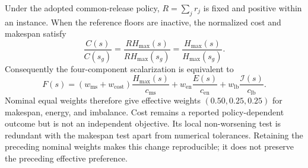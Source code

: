 Under the adopted common-release policy, $R=\sum_jr_j$ is fixed and positive within an instance. When the reference floors are inactive, the normalized cost and makespan satisfy
\[
\frac{C(s)}{C(s_g)}=\frac{R H_{\mathrm{max}}(s)}{R H_{\mathrm{max}}(s_g)}
=\frac{H_{\mathrm{max}}(s)}{H_{\mathrm{max}}(s_g)}.
\]
Consequently the four-component scalarization is equivalent to
\[
F(s)=(w_{\mathrm{ms}}+w_{\mathrm{cost}})\frac{H_{\mathrm{max}}(s)}{c_{\mathrm{ms}}}
+w_{\mathrm{en}}\frac{E(s)}{c_{\mathrm{en}}}+w_{\mathrm{lb}}\frac{\mathcal I(s)}{c_{\mathrm{lb}}}.
\]
Nominal equal weights therefore give effective weights $(0.50,0.25,0.25)$ for makespan, energy, and imbalance. Cost remains a reported policy-dependent outcome but is not an independent objective. Its local non-worsening test is redundant with the makespan test apart from numerical tolerances. Retaining the preceding nominal weights makes this change reproducible; it does not preserve the preceding effective preference.
